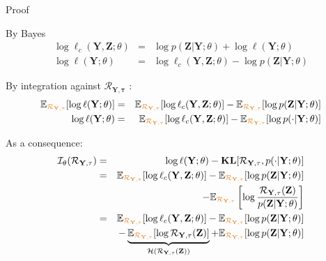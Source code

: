 \documentclass[compress,10pt]{beamer}
\newcommand{\bX}{\mathbf{Y}}
\newcommand{\Xall}{\mathbf{Y}}
\newcommand{\btau}{\mathbf{\tau}}
\newcommand{\bZ}{\mathbf{Z}}
\begin{document}
 \begin{frame}[allowframebreaks]{Proof}

By Bayes
\begin{eqnarray*}
\log \ell_c(\bX,\bZ; \theta)&=& \log  p(\bZ | \Xall; \theta) +   \log \ell(\Xall ; \theta)   \\
 \log \ell(\Xall ; \theta) &=& \log \ell_c(\bX,\bZ; \theta) -  \log  p(\bZ | \Xall; \theta)
\end{eqnarray*}

By integration against $\mathcal{R}_{\Xall,\btau}$ : 
\begin{eqnarray*}
 \mathbb{E}_{\color{dgreen}\mathcal{R}_{\Xall,\btau}} [ \log  \ell(\Xall ; \theta)] &=&  \mathbb{E}_{\color{dgreen}\mathcal{R}_{\Xall,\btau}} [\log \ell_c(\bX,\bZ; \theta)] -  \mathbb{E}_{\color{dgreen}\mathcal{R}_{\Xall,\btau}} [ \log  p(\bZ | \Xall; \theta)] \\
 \log \ell(\Xall ; \theta) &=&  \mathbb{E}_{\color{dgreen}\mathcal{R}_{\Xall,\btau}} [\log \ell_c(\bX,\bZ; \theta)] -  \mathbb{E}_{\color{dgreen}\mathcal{R}_{\Xall,\btau}} [ \log  p(\cdot | \Xall; \theta)]
\end{eqnarray*}

As a consequence: 
\begin{eqnarray*}
\mathcal{I}_{\theta}(\mathcal{R}_{\Xall,\btau}) &=& \log \ell(\Xall ; \theta) -   \mathbf{KL}[\mathcal{R}_{\Xall,\btau}, p(\cdot | \Xall; \theta)] \\
 &=& \mathbb{E}_{\color{dgreen}\mathcal{R}_{\Xall,\btau}} [\log \ell_c(\bX,\bZ; \theta)] -  \mathbb{E}_{\color{dgreen}\mathcal{R}_{\Xall,\btau}} [ \log  p(\bZ | \Xall; \theta)]  \\
&& -   \mathbb{E}_{\color{dgreen}\mathcal{R}_{\Xall,\btau}} \left[\log \frac{\mathcal{R}_{\Xall,\btau}(\bZ)} { p(\bZ | \Xall; \theta)}\right]\\
&=&  \mathbb{E}_{\color{dgreen}\mathcal{R}_{\Xall,\btau}} [\log \ell_c(\bX,\bZ; \theta)] -  \mathbb{E}_{\color{dgreen}\mathcal{R}_{\Xall,\btau}} [ \log  p(\bZ | \Xall; \theta)] \\
&& -   \underbrace{\mathbb{E}_{\color{dgreen}\mathcal{R}_{\Xall,\btau}} [\log \mathcal{R}_{\Xall,\btau}(\bZ)]}_{  \mathcal{H}\left(\mathcal{R}_{\Xall,\btau}(\bZ)\right) } +  \mathbb{E}_{\color{dgreen}\mathcal{R}_{\Xall,\btau}} [\log p(\bZ | \Xall; \theta)]
\end{eqnarray*}




  \end{frame}
\end{document}
